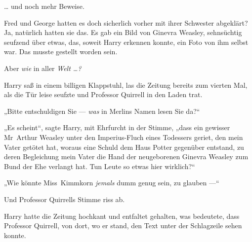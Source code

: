 … und noch mehr Beweise.

Fred und George hatten es doch sicherlich vorher mit ihrer Schwester abgeklärt? Ja, natürlich hatten sie das. Es gab ein Bild von Ginevra Weasley, sehnsüchtig seufzend über etwas, das, soweit Harry erkennen konnte, ein Foto von ihm selbst war. Das musste gestellt worden sein.

Aber \emph{wie} in aller \emph{Welt …?}

Harry saß in einem billigen Klappstuhl, las die Zeitung bereits zum vierten Mal, als die Tür leise seufzte und Professor Quirrell in den Laden trat.

„Bitte entschuldigen Sie — \emph{was} in Merlins Namen lesen Sie da?“

„Es scheint“, sagte Harry, mit Ehrfurcht in der Stimme, „dass ein gewisser Mr~Arthur Weasley unter den Imperius-Fluch eines Todessers geriet, den mein Vater getötet hat, woraus eine Schuld dem Haus Potter gegenüber entstand, zu deren Begleichung mein Vater die Hand der neugeborenen Ginevra Weasley zum Bund der Ehe verlangt hat. Tun Leute so etwas hier wirklich?“

„Wie könnte Miss~Kimmkorn \emph{jemals} dumm genug sein, zu glauben —“

Und Professor Quirrells Stimme riss ab.

Harry hatte die Zeitung hochkant und entfaltet gehalten, was bedeutete, dass Professor Quirrell, von dort, wo er stand, den Text unter der Schlagzeile sehen konnte.

